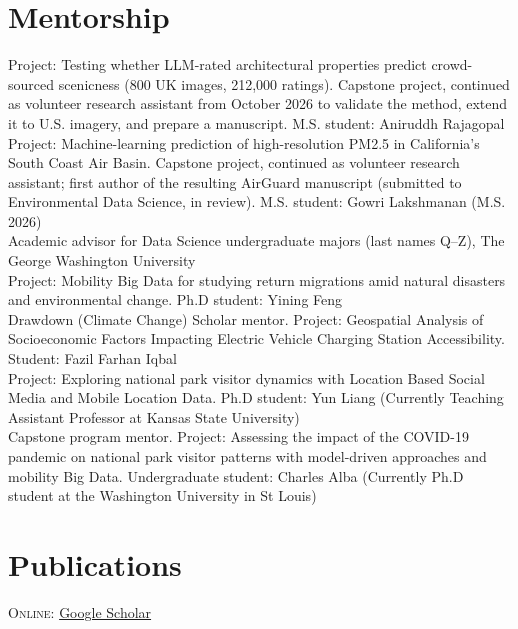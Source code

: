 \documentclass[11pt, a4paper]{article}
\newcommand{\years}[1]{\marginnote{\scriptsize #1}}
\begin{document}
\section*{Mentorship}
\years{2026} Project: Testing whether LLM-rated architectural properties predict crowd-sourced scenicness (800 UK images, 212,000 ratings). Capstone project, continued as volunteer research assistant from October 2026 to validate the method, extend it to U.S. imagery, and prepare a manuscript. M.S. student: Aniruddh Rajagopal\\
\years{2026} Project: Machine-learning prediction of high-resolution PM2.5 in California’s South Coast Air Basin. Capstone project, continued as volunteer research assistant; first author of the resulting AirGuard manuscript (submitted to Environmental Data Science, in review). M.S. student: Gowri Lakshmanan (M.S. 2026)\\
\years{2025-} Academic advisor for Data Science undergraduate majors (last names Q--Z), The George Washington University\\
\years{2023} Project: Mobility Big Data for studying return migrations amid natural disasters and environmental change. Ph.D student: Yining Feng\\
\years{2023} Drawdown (Climate Change) Scholar mentor. Project: Geospatial Analysis of Socioeconomic Factors Impacting Electric Vehicle Charging Station Accessibility. Student: Fazil Farhan Iqbal\\
\years{2022} Project: Exploring national park visitor dynamics with Location Based Social Media and Mobile Location Data. Ph.D student: Yun Liang (Currently Teaching Assistant Professor at Kansas State University)\\
\years{2021} Capstone program mentor. Project: Assessing the impact of the COVID-19 pandemic on national park visitor patterns with model-driven approaches and mobility Big Data. Undergraduate student: Charles Alba (Currently Ph.D student at the Washington University in St Louis)\\


\section*{Publications}
\textsc{Online}: \href{https://scholar.google.com/citations?hl=en&user=LW01O2YAAAAJ&view_op=list_works&sortby=pubdate}{Google Scholar}
\end{document}
